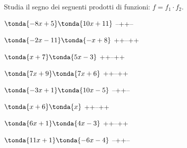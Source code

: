 \begin{esercizio}\label{ese:dis_5}
Studia il segno dei seguenti prodotti di funzioni: \(f = f_1 \cdot f_2\).
\begin{enumeratea}
\item  \(\tonda{-8 x +5}\tonda{10 x +11}\) \sol 
{--++--}
\item  \(\tonda{-2 x -11}\tonda{- x +8}\) \sol 
{++--++}
\item  \(\tonda{x +7}\tonda{5 x -3}\) \sol 
{++--++}
\item  \(\tonda{7 x +9}\tonda{7 x +6}\) \sol 
{++--++}
\item  \(\tonda{-3 x +1}\tonda{10 x -5}\) \sol 
{--++--}
\item  \(\tonda{x +6}\tonda{x }\) \sol 
{++--++}
\item  \(\tonda{6 x +1}\tonda{4 x -3}\) \sol 
{++--++}
\item  \(\tonda{11 x +1}\tonda{-6 x -4}\) \sol 
{--++--}
\end{enumeratea}
\end{esercizio}

